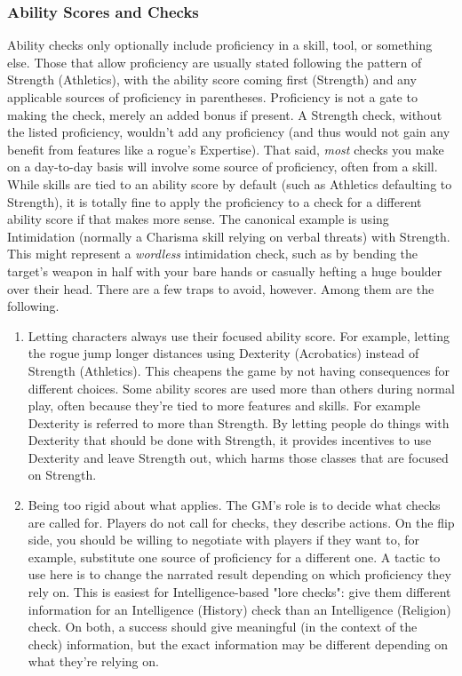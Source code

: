 \documentclass[10pt,twoside,openany,bg=none]{dndbook}
\begin{document}
\subsubsection{Ability Scores and Checks}
Ability checks only optionally include proficiency in a skill, tool, or something else. Those that allow proficiency are usually stated following the pattern of Strength (Athletics), with the ability score coming first (Strength) and any applicable sources of proficiency in parentheses. Proficiency is not a gate to making the check, merely an added bonus if present. A Strength check, without the listed proficiency, wouldn't add any proficiency (and thus would not gain any benefit from features like a rogue's Expertise). That said, \textit{most} checks you make on a day-to-day basis will involve some source of proficiency, often from a skill. While skills are tied to an ability score by default (such as Athletics defaulting to Strength), it is totally fine to apply the proficiency to a check for a different ability score if that makes more sense. The canonical example is using Intimidation (normally a Charisma skill relying on verbal threats) with Strength. This might represent a \textit{wordless} intimidation check, such as by bending the target's weapon in half with your bare hands or casually hefting a huge boulder over their head. There are a few traps to avoid, however. Among them are the following.
\begin{enumerate}
    \item Letting characters always use their focused ability score. For example, letting the rogue jump longer distances using Dexterity (Acrobatics) instead of Strength (Athletics). This cheapens the game by not having consequences for different choices. Some ability scores are used more than others during normal play, often because they're tied to more features and skills. For example Dexterity is referred to more than Strength. By letting people do things with Dexterity that should be done with Strength, it provides incentives to use Dexterity and leave Strength out, which harms those classes that are focused on Strength.
    \item Being too rigid about what applies. The GM's role is to decide what checks are called for. Players do not call for checks, they describe actions. On the flip side, you should be willing to negotiate with players if they want to, for example, substitute one source of proficiency for a different one. A tactic to use here is to change the narrated result depending on which proficiency they rely on. This is easiest for Intelligence-based "lore checks": give them different information for an Intelligence (History) check than an Intelligence (Religion) check. On both, a success should give meaningful (in the context of the check) information, but the exact information may be different depending on what they're relying on.
\end{enumerate}
\end{document}
